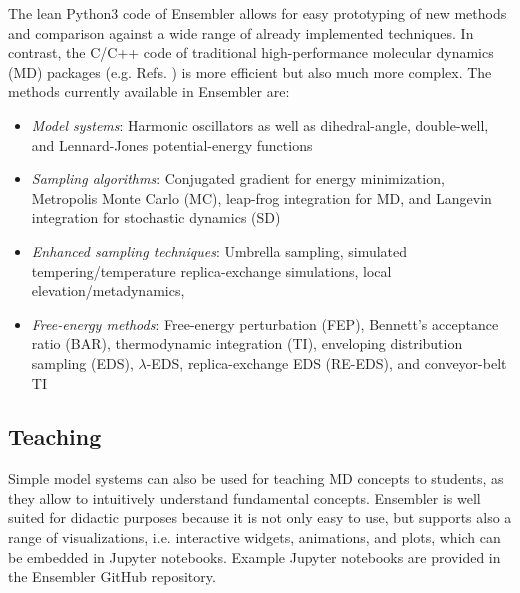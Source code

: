 The lean Python3 code\cite{Vanrossum2009} of Ensembler allows for easy prototyping of new methods and comparison against a wide range of already implemented techniques. 
In contrast, the C/C++\cite{Stroustrup1995} code of traditional high-performance molecular dynamics (MD) packages (e.g. Refs. \cite{Berendsen1995,Lindahl2001,Vanderspoel2005,Eastman2017,Brooks2009}) is more efficient but also much more complex. 
%
The methods currently available in Ensembler are:
\begin{itemize}
	\item \textit{Model systems}: Harmonic oscillators as well as dihedral-angle, double-well, and Lennard-Jones potential-energy functions\cite{Jones1924}
	\item \textit{Sampling algorithms}: Conjugated gradient\cite{Hestenes1952} for energy minimization, Metropolis Monte Carlo (MC),\cite{Hastings1970} leap-frog integration\cite{Vangunsteren1988} for MD, and Langevin integration\cite{Brunger1984} for stochastic dynamics (SD)
	\item \textit{Enhanced sampling techniques}: Umbrella sampling,\cite{Valleau1977} simulated tempering/temperature replica-exchange simulations,\cite{Sugita1999} local elevation/metadynamics,\cite{Huber1994, Laio2002}
	\item \textit{Free-energy methods}: Free-energy perturbation (FEP),\cite{Zwanzig1954} Bennett's acceptance ratio (BAR),\cite{Bennett1976} thermodynamic integration (TI),\cite{Kirkwood1935} enveloping distribution sampling (EDS),\cite{Christ2007, Christ2008, Christ2009} $\lambda$-EDS,\cite{Koenig2020} replica-exchange EDS (RE-EDS),\cite{Sidler2016} and conveyor-belt TI\cite{Hahn2019}
\end{itemize}

\subsection{Teaching}

Simple model systems can also be used for teaching MD concepts to students, as they allow to intuitively understand fundamental concepts. \cite{Pohorille2010} 
Ensembler is well suited for didactic purposes because it is not only easy to use, but supports also a range of visualizations, i.e. interactive widgets, animations, and plots, which can be embedded in Jupyter notebooks.\cite{Kluyver2016}
Example Jupyter notebooks\cite{Kluyver2016} are provided in the Ensembler GitHub repository.